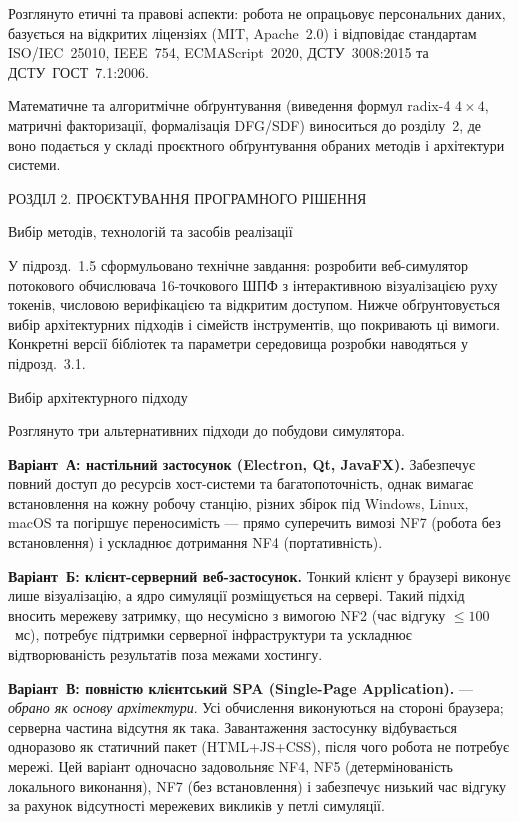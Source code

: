 Розглянуто етичні та правові аспекти: робота не опрацьовує персональних
даних, базується на відкритих ліцензіях (MIT, Apache~2.0) і відповідає
стандартам ISO/IEC~25010, IEEE~754, ECMAScript~2020, ДСТУ~3008:2015 та
ДСТУ~ГОСТ~7.1:2006.

Математичне та алгоритмічне обґрунтування (виведення формул radix-4
\(4 \times 4\), матричні факторизації, формалізація DFG/SDF) виноситься
до розділу~2, де воно подається у складі проєктного обґрунтування
обраних методів і архітектури системи.

\protect{}\label{_Toc228121443}{}РОЗДІЛ 2. ПРОЄКТУВАННЯ
ПРОГРАМНОГО РІШЕННЯ

\protect{}\label{_Toc228121444}{}Вибір методів, технологій
та засобів реалізації

У підрозд.~1.5 сформульовано технічне завдання: розробити веб-симулятор
потокового обчислювача 16-точкового ШПФ з інтерактивною візуалізацією
руху токенів, числовою верифікацією та відкритим доступом. Нижче
обґрунтовується вибір архітектурних підходів і сімейств інструментів, що
покривають ці вимоги. Конкретні версії бібліотек та параметри середовища
розробки наводяться у підрозд.~3.1.

Вибір архітектурного підходу

Розглянуто три альтернативних підходи до побудови симулятора.

\textbf{Варіант~А: настільний застосунок (Electron, Qt, JavaFX).}
Забезпечує повний доступ до ресурсів хост-системи та багатопоточність,
однак вимагає встановлення на кожну робочу станцію, різних збірок під
Windows, Linux, macOS та погіршує переносимість --- прямо суперечить
вимозі NF7 (робота без встановлення) і ускладнює дотримання NF4
(портативність).

\textbf{Варіант~Б: клієнт-серверний веб-застосунок.} Тонкий клієнт у
браузері виконує лише візуалізацію, а ядро симуляції розміщується на
сервері. Такий підхід вносить мережеву затримку, що несумісно з вимогою
NF2 (час відгуку \(\leq 100\)~мс), потребує підтримки серверної
інфраструктури та ускладнює відтворюваність результатів поза межами
хостингу.

\textbf{Варіант~В: повністю клієнтський SPA (Single-Page Application).}
--- \emph{обрано як основу архітектури}. Усі обчислення виконуються на
стороні браузера; серверна частина відсутня як така. Завантаження
застосунку відбувається одноразово як статичний пакет (HTML+JS+CSS),
після чого робота не потребує мережі. Цей варіант одночасно задовольняє
NF4, NF5 (детермінованість локального виконання), NF7 (без встановлення)
і забезпечує низький час відгуку за рахунок відсутності мережевих
викликів у петлі симуляції.

